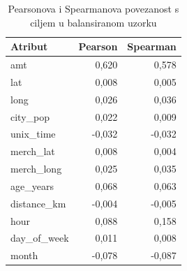 \begin{table}[H]\centering\small
\caption{Pearsonova i Spearmanova povezanost s ciljem u balansiranom uzorku}
\begin{tabularx}{\linewidth}{@{}Yrr@{}}\toprule
Atribut & Pearson & Spearman \\ \midrule
amt & 0,620 & 0,578 \\
lat & 0,008 & 0,005 \\
long & 0,026 & 0,036 \\
city\_pop & 0,022 & 0,009 \\
unix\_time & -0,032 & -0,032 \\
merch\_lat & 0,008 & 0,004 \\
merch\_long & 0,025 & 0,035 \\
age\_years & 0,068 & 0,063 \\
distance\_km & -0,004 & -0,005 \\
hour & 0,088 & 0,158 \\
day\_of\_week & 0,011 & 0,008 \\
month & -0,078 & -0,087 \\
\bottomrule\end{tabularx}\end{table}
